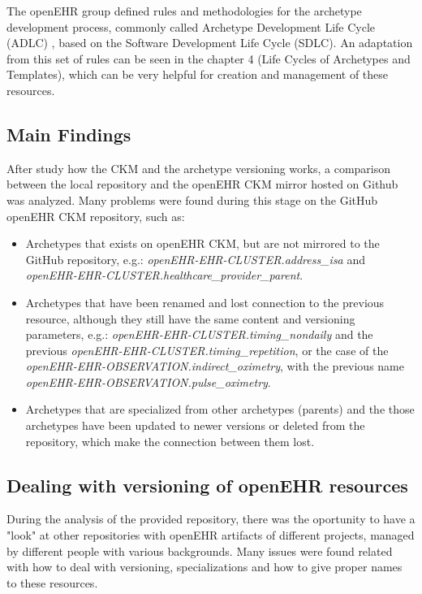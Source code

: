 \documentclass[mim_thesis.tex]{subfiles}
\begin{document}
The openEHR group defined rules and methodologies for the archetype development process, commonly called Archetype Development Life Cycle (ADLC) \citep{Madsen2010}, based on the Software Development Life Cycle (SDLC). An adaptation from this set of rules can be seen in the chapter 4 (Life Cycles of Archetypes and Templates), which can be very helpful for creation and management of these resources.



\subsection{Main Findings}
After study how the CKM and the archetype versioning works, a comparison between the local repository and the openEHR CKM mirror hosted on Github was analyzed. Many problems were found during this stage on the GitHub openEHR CKM repository, such as:

\begin{itemize}
\item Archetypes that exists on openEHR CKM, but are not mirrored to the GitHub repository, e.g.: \textit{openEHR-EHR-CLUSTER.address\_isa} and \textit{openEHR-EHR-CLUSTER.healthcare\_provider\_parent}.
\item Archetypes that have been renamed and lost connection to the previous resource, although they still have the same content and versioning parameters, e.g.: \textit{openEHR-EHR-CLUSTER.timing\_nondaily} and the previous \textit{openEHR-EHR-CLUSTER.timing\_repetition}, or the case of the \textit{openEHR-EHR-OBSERVATION.indirect\_oximetry}, with the previous name \textit{openEHR-EHR-OBSERVATION.pulse\_oximetry}. 
\item Archetypes that are specialized from other archetypes (parents) and the those archetypes have been updated to newer versions or deleted from the repository, which make the connection between them lost.
\end{itemize}



\subsection{Dealing with versioning of openEHR resources}

During the analysis of the provided repository, there was the oportunity to have a "look" at other repositories with openEHR artifacts of different projects, managed by different people with various backgrounds. Many issues were found related with how to deal with versioning, specializations and how to give proper names to these resources.  
\end{document}
